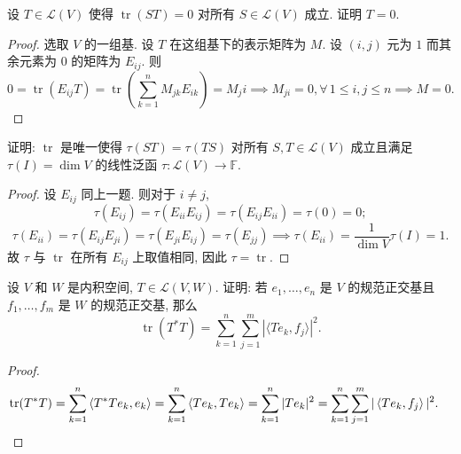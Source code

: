 \documentclass{article}
\begin{document}
\begin{problem}[8D-9]
设 $T \in \mathcal{L}(V)$ 使得 $\operatorname{tr}(ST) = 0$ 对所有 $S \in \mathcal{L}(V)$ 成立. 证明 $T = 0$.
\end{problem}

\begin{proof}
  选取 \( V \) 的一组基. 设 \( T \) 在这组基下的表示矩阵为 \( M \). 设 \( (i,j) \) 元为 \( 1 \) 而其余元素为 \( 0 \) 的矩阵为 \( E_{ij} \). 则
  \[ 0 = \operatorname{tr}(E_{ij} T) = \operatorname{tr}\left( \sum_{k=1}^{n} M_{jk} E_{ik} \right) = M_ji 
  \implies M_{ji}=0, \forall\, 1\le i,j\le n
  \implies M=0. \]
\end{proof}



\begin{problem}[8D-10]
证明: $\operatorname{tr} $ 是唯一使得 $\tau(ST) = \tau(TS)$ 对所有 $S, T \in \mathcal{L}(V)$ 成立且满足 $\tau(I) = \dim V$ 的线性泛函 $\tau : \mathcal{L}(V) \to \mathbb{F}$.
\end{problem}

\begin{proof}
  设 \( E_{ij} \) 同上一题. 则对于 \( i\neq j \), 
  \[ \tau(E_{ij}) = \tau(E_{ii}E_{ij}) = \tau(E_{ij}E_{ii}) = \tau(0)=0; \]
  \quad
  \[ \tau(E_{ii}) = \tau(E_{ij}E_{ji}) = \tau(E_{ji}E_{ij}) = \tau(E_{jj})
  \implies \tau(E_{ii})=\frac{1}{\dim V}\tau(I) = 1. \]
  故 \( \tau \) 与 \( \operatorname{tr} \) 在所有 \( E_{ij} \) 上取值相同, 因此 \( \tau = \operatorname{tr} \).
\end{proof}



\begin{problem}[8D-11]
设 $V$ 和 $W$ 是内积空间, $T \in \mathcal{L}(V, W)$. 证明: 若 $e_1, \ldots, e_n$ 是 $V$ 的规范正交基且 $f_1, \ldots, f_m$ 是 $W$ 的规范正交基, 那么
\[
\operatorname{tr}(T^* T) = \sum_{k=1}^n \sum_{j=1}^m |\langle T e_k, f_j \rangle|^2.
\]
\end{problem}

\begin{proof}
  \begin{align*}
    \operatorname{tr}(T^* T) &= \sum_{k=1}^n \left\langle T^*Te_k, e_k \right\rangle 
    = \sum_{k=1}^n \left\langle Te_k, Te_k \right\rangle 
    = \sum_{k=1}^n |Te_k|^2 
    = \sum_{k=1}^n \sum_{j=1}^m |\left\langle Te_k, f_j \right\rangle|^2.
  \end{align*}
\end{proof}
\end{document}

